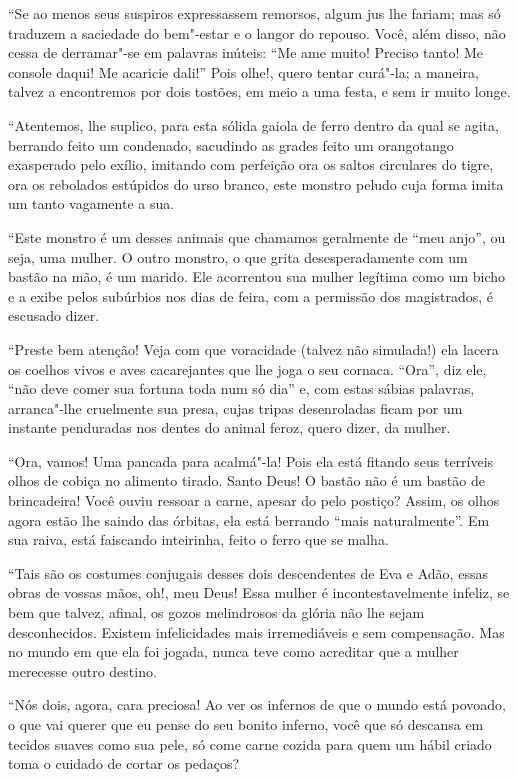 “Se ao menos seus suspiros expressassem remorsos, algum
jus lhe fariam; mas só traduzem a saciedade do bem"-estar e o
langor do repouso. Você, além disso, não cessa de derramar"-se em
palavras inúteis: ``Me ame muito! Preciso tanto! Me
console daqui! Me acaricie dali!'' Pois olhe!, quero tentar
curá"-la; a maneira, talvez a encontremos por dois tostões, em meio a
uma festa, e sem ir muito longe.

“Atentemos, lhe suplico, para esta sólida gaiola de
ferro dentro da qual se agita, berrando feito um condenado, sacudindo
as grades feito um orangotango exasperado pelo exílio, imitando com
perfeição ora os saltos circulares do tigre, ora os rebolados
estúpidos do urso branco, este monstro peludo cuja forma imita um tanto
vagamente a sua.

“Este monstro é um desses animais que chamamos geralmente
de ``meu anjo'', ou seja, uma mulher. O outro
monstro, o que grita desesperadamente com um bastão na mão, é um
marido. Ele acorrentou sua mulher legítima como um bicho e a exibe
pelos subúrbios nos dias de feira, com a permissão dos magistrados, é
escusado dizer.



“Preste bem atenção! Veja com que voracidade (talvez não
simulada!) ela lacera os coelhos vivos e aves cacarejantes que lhe joga o
seu cornaca. ``Ora'', diz ele, ``não deve comer sua fortuna toda num só
dia'' e, com estas sábias palavras, arranca"-lhe
cruelmente sua presa, cujas tripas desenroladas ficam por um instante
penduradas nos dentes do animal feroz, quero dizer, da mulher.

“Ora, vamos! Uma pancada para acalmá"-la! Pois ela está fitando
seus terríveis olhos de cobiça no alimento tirado. Santo Deus! O bastão
não é um bastão de brincadeira! Você ouviu ressoar a carne, apesar do
pelo postiço? Assim, os olhos agora estão lhe saindo das órbitas, ela
está berrando ``mais naturalmente''. Em sua raiva, está faiscando
inteirinha, feito o ferro que se malha.

“Tais são os costumes conjugais desses dois descendentes
de Eva e Adão, essas obras de vossas mãos, oh!, meu Deus! Essa mulher
é incontestavelmente infeliz, se bem que talvez, afinal, os
gozos melindrosos da glória não lhe sejam desconhecidos. Existem
infelicidades mais irremediáveis e sem compensação. Mas no mundo em
que ela foi jogada, nunca teve como acreditar que a mulher merecesse
outro destino.

“Nós dois, agora, cara preciosa! Ao ver os infernos de que
o mundo está povoado, o que vai querer que eu pense do seu bonito
inferno, você que só descansa em tecidos suaves como sua pele,
só come carne cozida para quem um hábil criado toma o
cuidado de cortar os pedaços?


